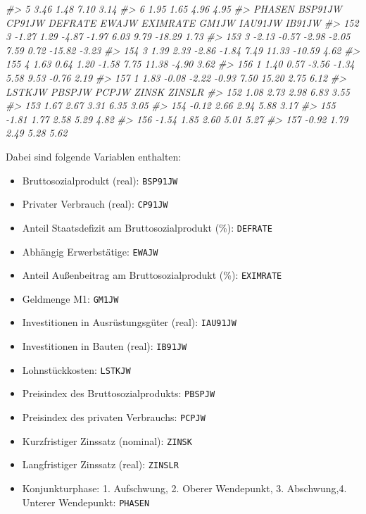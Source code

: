 \documentclass[12pt,]{book}
\newenvironment{Shaded}{\begin{snugshade}}{\end{snugshade}}
\newcommand{\CommentTok}[1]{\textcolor[rgb]{0.56,0.35,0.01}{\textit{{#1}}}}
\providecommand{\tightlist}{%
  \setlength{\itemsep}{0pt}\setlength{\parskip}{0pt}}
\begin{document}
\begin{Shaded}
\begin{Highlighting}[]
\CommentTok{#> 5   3.46  1.48  7.10   3.14}
\CommentTok{#> 6   1.95  1.65  4.96   4.95}
\CommentTok{#>     PHASEN BSP91JW CP91JW DEFRATE EWAJW EXIMRATE GM1JW IAU91JW IB91JW}
\CommentTok{#> 152      3   -1.27   1.29   -4.87 -1.97     6.03  9.79  -18.29   1.73}
\CommentTok{#> 153      3   -2.13  -0.57   -2.98 -2.05     7.59  0.72  -15.82  -3.23}
\CommentTok{#> 154      3    1.39   2.33   -2.86 -1.84     7.49 11.33  -10.59   4.62}
\CommentTok{#> 155      4    1.63   0.64    1.20 -1.58     7.75 11.38   -4.90   3.62}
\CommentTok{#> 156      1    1.40   0.57   -3.56 -1.34     5.58  9.53   -0.76   2.19}
\CommentTok{#> 157      1    1.83  -0.08   -2.22 -0.93     7.50 15.20    2.75   6.12}
\CommentTok{#>     LSTKJW PBSPJW PCPJW ZINSK ZINSLR}
\CommentTok{#> 152   1.08   2.73  2.98  6.83   3.55}
\CommentTok{#> 153   1.67   2.67  3.31  6.35   3.05}
\CommentTok{#> 154  -0.12   2.66  2.94  5.88   3.17}
\CommentTok{#> 155  -1.81   1.77  2.58  5.29   4.82}
\CommentTok{#> 156  -1.54   1.85  2.60  5.01   5.27}
\CommentTok{#> 157  -0.92   1.79  2.49  5.28   5.62}
\end{Highlighting}
\end{Shaded}

Dabei sind folgende Variablen enthalten:

\begin{itemize}
\tightlist
\item
  Bruttosozialprodukt (real): \texttt{BSP91JW}
\item
  Privater Verbrauch (real): \texttt{CP91JW}
\item
  Anteil Staatsdefizit am Bruttosozialprodukt (\%): \texttt{DEFRATE}
\item
  Abhängig Erwerbstätige: \texttt{EWAJW}
\item
  Anteil Außenbeitrag am Bruttosozialprodukt (\%): \texttt{EXIMRATE}
\item
  Geldmenge M1: \texttt{GM1JW}
\item
  Investitionen in Ausrüstungsgüter (real): \texttt{IAU91JW}
\item
  Investitionen in Bauten (real): \texttt{IB91JW}
\item
  Lohnstückkosten: \texttt{LSTKJW}
\item
  Preisindex des Bruttosozialprodukts: \texttt{PBSPJW}
\item
  Preisindex des privaten Verbrauchs: \texttt{PCPJW}
\item
  Kurzfristiger Zinssatz (nominal): \texttt{ZINSK}
\item
  Langfristiger Zinssatz (real): \texttt{ZINSLR}
\item
  Konjunkturphase: 1. Aufschwung, 2. Oberer Wendepunkt, 3. Abschwung,4.
  Unterer Wendepunkt: \texttt{PHASEN}
\end{itemize}
\end{document}
